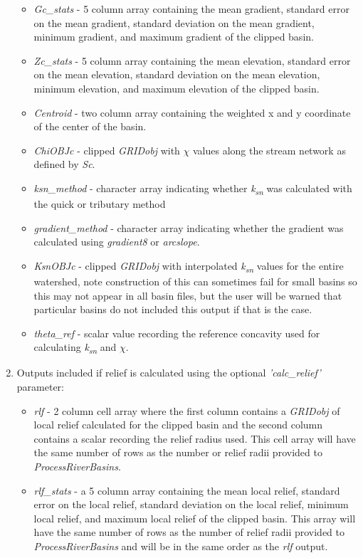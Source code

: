 \begin{enumerate}
\begin{itemize}
		\item \textit{Gc\_stats} - 5 column array containing the mean gradient, standard error on the mean gradient, standard deviation on the mean gradient, minimum gradient, and maximum gradient of the clipped basin.
		\item \textit{Zc\_stats} - 5 column array containing the mean elevation, standard error on the mean elevation, standard deviation on the mean elevation, minimum elevation, and maximum elevation of the clipped basin.
		\item \textit{Centroid} - two column array containing the weighted x and y coordinate of the center of the basin.
		\item \textit{ChiOBJc} - clipped \textit{GRIDobj} with $\chi$ values along the stream network as defined by \textit{Sc}.
		\item \textit{ksn\_method} - character array indicating whether \textit{k\textsubscript{sn}} was calculated with the quick or tributary method
		\item \textit{gradient\_method} - character array indicating whether the gradient was calculated using \textit{gradient8} or \textit{arcslope}.
		\item \textit{KsnOBJc} - clipped \textit{GRIDobj} with interpolated \textit{k\textsubscript{sn}} values for the entire watershed, note construction of this can sometimes fail for small basins so this may not appear in all basin files, but the user will be warned that particular basins do not included this output if that is the case.
		\item \textit{theta\_ref} - scalar value recording the reference concavity used for calculating \textit{k\textsubscript{sn}} and $\chi$.
	\end{itemize}
	\item Outputs included if relief is calculated using the optional \textit{'calc\_relief'} parameter:
	\begin{itemize}
		\item \textit{rlf} - 2 column cell array where the first column contains a \textit{GRIDobj} of local relief calculated for the clipped basin and the second column contains a scalar recording the relief radius used. This cell array will have the same number of rows as the number or relief radii provided to \textit{ProcessRiverBasins}.
		\item \textit{rlf\_stats} - a 5 column array containing the mean local relief, standard error on the local relief, standard deviation on the local relief, minimum local relief, and maximum local relief of the clipped basin. This array will have the same number of rows as the number of relief radii provided to \textit{ProcessRiverBasins} and will be in the same order as the \textit{rlf} output.

\end{itemize}
\end{enumerate}
